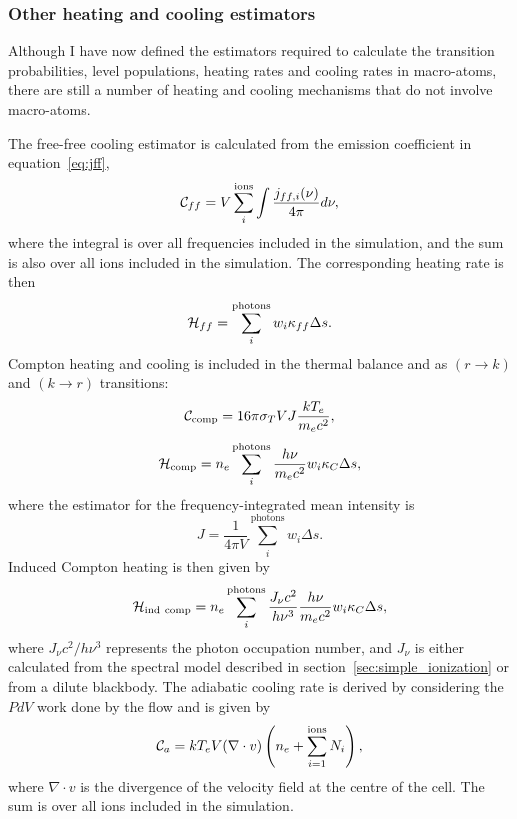 \subsubsection{Other heating and cooling estimators}
Although I have now defined the estimators required to calculate the 
transition probabilities, level populations, heating rates and cooling rates in macro-atoms, 
there are still a number of heating and cooling mechanisms that do not involve macro-atoms. 

The free-free cooling estimator is calculated from the emission coefficient
in equation~\ref{eq:jff},
\begin{equation}
{\cal C}_{ff} = V \sum_i^{\mathrm{ions}} \int \frac{j_{ff,i}(\nu)}{4\pi} d\nu,
\end{equation}
where the integral is over all frequencies included in the simulation,
and the sum is also over all ions included in the simulation.
The corresponding heating rate is then
\begin{equation}
{\cal H}_{ff} = \sum_i^{\mathrm{photons}} w_i \kappa_{ff} \Delta s.
\end{equation}
Compton heating and cooling is included in the thermal balance and as
$(r\rightarrow k)$ and $(k\rightarrow r)$ transitions:
\begin{equation}
{\cal C}_{\mathrm{comp}} = 16 \pi \sigma_T V J \frac{k T_e}{m_e c^2},
\end{equation}
\begin{equation}
{\cal H}_{\mathrm{comp}} = n_e \sum_i^{\mathrm{photons}} \frac{h\nu}{m_e c^2} w_i \kappa_{C}\Delta s,
\end{equation}
where the estimator for the frequency-integrated mean intensity is
\begin{equation}
J = \frac{1}{4\pi V} \sum_i^{\mathrm{photons}} w_i \Delta s.
\label{eq:j}
\end{equation}
Induced Compton heating is then given by \citep{cloudy2013}
\begin{equation}
{\cal H}_{\mathrm{ind~comp}} = n_e \sum_i^{\mathrm{photons}} \frac{J_\nu c^2}{h \nu^3} \frac{h\nu}{m_e c^2} 
w_i \kappa_{C} \Delta s,
\end{equation}
where $J_\nu c^2/h \nu^3$ represents the
photon occupation number, and $J_\nu$ is either 
calculated from the spectral model
described in section~\ref{sec:simple_ionization} or from a dilute blackbody.
The adiabatic cooling rate is derived by considering the $PdV$ work done by the flow
and is given by
\begin{equation}
{\cal C}_{a} = k T_e V (\nabla \cdot v) \left(n_e + \sum\limits_{i=1}^{\mathrm{ions}} N_i\right),
\end{equation}
where $\nabla \cdot v$ is the divergence of the 
velocity field at the centre of the cell. The sum is over all ions 
included in the simulation.

